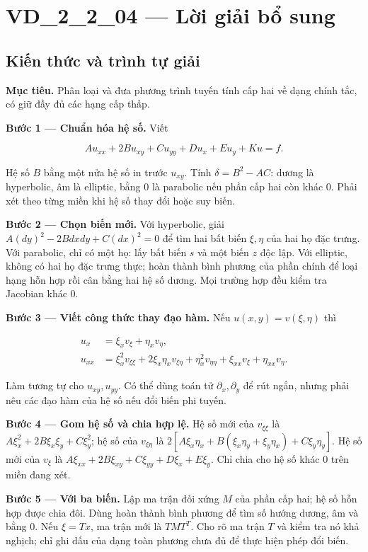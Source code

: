 \documentclass[10pt,a4paper]{article}
\begin{document}
\section*{VD\_2\_2\_04 — Lời giải bổ sung}
\subsection*{Kiến thức và trình tự giải}
\textbf{Mục tiêu.} Phân loại và đưa phương trình tuyến tính cấp hai về dạng chính tắc, có giữ đầy đủ các hạng cấp thấp.

\textbf{Bước 1 — Chuẩn hóa hệ số.} Viết


\[
A u_{xx}+2B u_{xy}+C u_{yy}+D u_x+E u_y+K u=f.
\]


Hệ số $B$ bằng một nửa hệ số in trước $u_{xy}$. Tính $\delta=B^2-AC$: dương là hyperbolic, âm là elliptic, bằng $0$ là parabolic nếu phần cấp hai còn khác $0$. Phải xét theo từng miền khi hệ số thay đổi hoặc suy biến.

\textbf{Bước 2 — Chọn biến mới.} Với hyperbolic, giải $A(dy)^2-2Bdxdy+C(dx)^2=0$ để tìm hai bất biến $\xi,\eta$ của hai họ đặc trưng. Với parabolic, chỉ có một họ: lấy bất biến $s$ và một biến $z$ độc lập. Với elliptic, không có hai họ đặc trưng thực; hoàn thành bình phương của phần chính để loại hạng hỗn hợp rồi cân bằng hai hệ số dương. Mọi trường hợp đều kiểm tra Jacobian khác $0$.

\textbf{Bước 3 — Viết công thức thay đạo hàm.} Nếu $u(x,y)=v(\xi,\eta)$ thì


\[
\begin{aligned}
u_x&=\xi_xv_\xi+\eta_xv_\eta,\\
u_{xx}&=\xi_x^2v_{\xi\xi}+2\xi_x\eta_xv_{\xi\eta}
+\eta_x^2v_{\eta\eta}+\xi_{xx}v_\xi+\eta_{xx}v_\eta.
\end{aligned}
\]


Làm tương tự cho $u_{xy},u_{yy}$. Có thể dùng toán tử $\partial_x,\partial_y$ để rút ngắn, nhưng phải nêu các đạo hàm của hệ số nếu đổi biến phi tuyến.

\textbf{Bước 4 — Gom hệ số và chia hợp lệ.} Hệ số mới của $v_{\xi\xi}$ là $A\xi_x^2+2B\xi_x\xi_y+C\xi_y^2$; hệ số của $v_{\xi\eta}$ là $2[A\xi_x\eta_x+B(\xi_x\eta_y+\xi_y\eta_x)+C\xi_y\eta_y]$. Hệ số mới của $v_\xi$ là $A\xi_{xx}+2B\xi_{xy}+C\xi_{yy}+D\xi_x+E\xi_y$. Chỉ chia cho hệ số khác $0$ trên miền đang xét.

\textbf{Bước 5 — Với ba biến.} Lập ma trận đối xứng $M$ của phần cấp hai; hệ số hỗn hợp được chia đôi. Dùng hoàn thành bình phương để tìm số hướng dương, âm và bằng $0$. Nếu $\xi=T x$, ma trận mới là $TMT^T$. Cho rõ ma trận $T$ và kiểm tra nó khả nghịch; chỉ ghi dấu của dạng toàn phương chưa đủ để thực hiện phép đổi biến.
\end{document}
